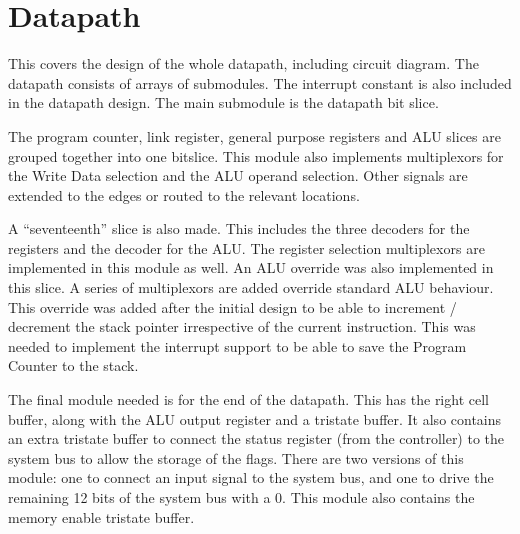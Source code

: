 

\section{Datapath}

This covers the design of the whole datapath, including circuit diagram.
The datapath consists of arrays of submodules. 
The interrupt constant is also included in the datapath design.
The main submodule is the datapath bit slice. 


The program counter, link register, general purpose registers and ALU slices are grouped together into one bitslice.
This module also implements multiplexors for the Write Data selection and the ALU operand selection.
Other signals are extended to the edges or routed to the relevant locations. 

A ``seventeenth'' slice is also made. 
This includes the three decoders for the registers and the decoder for the ALU.
The register selection multiplexors are implemented in this module as well.
An ALU override was also implemented in this slice.
A series of multiplexors are added override standard ALU behaviour.%
This override was added after the initial design to be able to increment / decrement the stack pointer irrespective of the current instruction.
This was needed to implement the interrupt support to be able to save the Program Counter to the stack.

The final module needed is for the end of the datapath. 
This has the right cell buffer, along with the ALU output register and a tristate buffer.
It also contains an extra tristate buffer to connect the status register (from the controller) to the system bus to allow the storage of the flags.
There are two versions of this module: one to connect an input signal to the system bus, and one to drive the remaining 12 bits of the system bus with a 0. 
This module also contains the memory enable tristate buffer.

